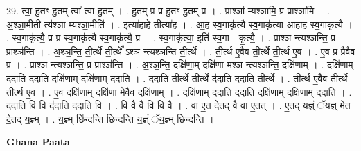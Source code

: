 \documentclass[17pt]{extarticle}
\begin{document}
29. त्वा॒ हु॒तꣳ हु॒तम् त्वा᳚ त्वा हु॒तम् । . हु॒तम् प्र प्र हु॒तꣳ हु॒तम् प्र । . प्राश्ञा᳚ म्यश्ञामि॒ प्र प्राश्ञा॑मि । . अ॒श्ञा॒मीती त्य॑श्ञा म्यश्ञा॒मीति॑ । . इत्या॑हा॒हे तीत्या॑ह । . आ॒ह॒ स्व॒गाकृ॑त्यै स्व॒गाकृ॑त्या आहाह स्व॒गाकृ॑त्यै । . स्व॒गाकृ॑त्यै॒ प्र प्र स्व॒गाकृ॑त्यै स्व॒गाकृ॑त्यै॒ प्र । . स्व॒गाकृ॑त्या॒ इति॑ स्व॒गा - कृ॒त्यै॒ । . प्राश्ञ॑ न्त्यश्ञन्ति॒ प्र प्राश्ञ॑न्ति । . अ॒श्ञ॒न्ति॒ ती॒र्त्थे ती॒र्त्थे᳚ ऽश्ञ न्त्यश्ञन्ति ती॒र्त्थे । . ती॒र्त्थ ए॒वैव ती॒र्त्थे ती॒र्त्थ ए॒व । . ए॒व प्र प्रैवैव प्र । . प्राश्ञ॑ न्त्यश्ञन्ति॒ प्र प्राश्ञ॑न्ति । . अ॒श्ञ॒न्ति॒ दक्षि॑णा॒म् दक्षि॑णा मश्ञ न्त्यश्ञन्ति॒ दक्षि॑णाम् । . दक्षि॑णाम् ददाति ददाति॒ दक्षि॑णा॒म् दक्षि॑णाम् ददाति । . द॒दा॒ति॒ ती॒र्त्थे ती॒र्त्थे द॑दाति ददाति ती॒र्त्थे । . ती॒र्त्थ ए॒वैव ती॒र्त्थे ती॒र्त्थ ए॒व । . ए॒व दक्षि॑णा॒म् दक्षि॑णा मे॒वैव दक्षि॑णाम् । . दक्षि॑णाम् ददाति ददाति॒ दक्षि॑णा॒म् दक्षि॑णाम् ददाति । . द॒दा॒ति॒ वि वि द॑दाति ददाति॒ वि । . वि वै वै वि वि वै । . वा ए॒त दे॒तद् वै वा ए॒तत् । . ए॒तद् य॒ज्ञ्ं ॅय॒ज्ञ् मे॒त दे॒तद् य॒ज्ञ्म् । . य॒ज्ञ्म् छि॑न्दन्ति छिन्दन्ति य॒ज्ञ्ं ॅय॒ज्ञ्म् छि॑न्दन्ति । \newline

\textbf{Ghana Paata } \newline
\end{document}
